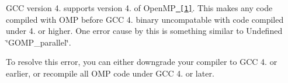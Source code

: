 G\+CC version 4. supports version 4. of Open\+MP\href{https://software.intel.com/en-us/articles/gcc-49-openmp-code-cannot-be-linked-with-intel-openmp-runtime}{\texttt{ \mbox{[}1\mbox{]}}}. This makes any code compiled with O\+MP before G\+CC 4. binary uncompatable with code compiled under 4. or higher. One error cause by this is something similar to {\ttfamily Undefined \char`\"{}\+G\+O\+M\+P\+\_\+parallel\char`\"{}}.

To resolve this error, you can either downgrade your compiler to G\+CC 4. or earlier, or recompile all O\+MP code under G\+CC 4. or later. 